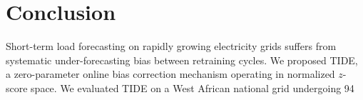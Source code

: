 \documentclass[10pt,twocolumn,letterpaper]{article}
\begin{document}
\section{Conclusion}
\label{sec:conclusion}
Short-term load forecasting on rapidly growing electricity grids suffers from systematic under-forecasting bias between retraining cycles. We proposed TIDE, a zero-parameter online bias correction mechanism operating in normalized $z$-score space. We evaluated TIDE on a West African national grid undergoing 94%
\end{document}
